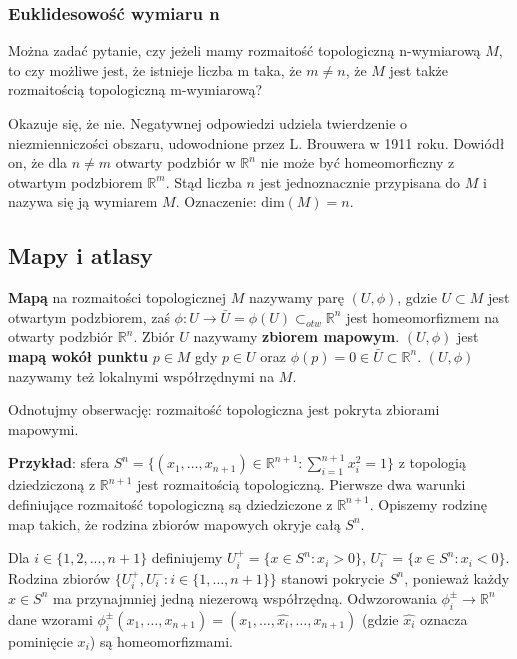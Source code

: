 \subsubsection{Euklidesowość wymiaru n}
Można zadać pytanie, czy jeżeli mamy rozmaitość topologiczną n-wymiarową $M$, to czy możliwe jest, że istnieje liczba m taka, że $m \neq n$, że $M$ jest także rozmaitością topologiczną m-wymiarową?

Okazuje się, że nie. Negatywnej odpowiedzi udziela twierdzenie o niezmienniczości obszaru, udowodnione przez L. Brouwera w 1911 roku. Dowiódł on, że dla $n \neq m$ otwarty podzbiór w $\mathbb{R}^n$ nie może być homeomorficzny z otwartym podzbiorem $\mathbb{R}^m$. Stąd liczba $n$ jest jednoznacznie przypisana do $M$ i nazywa się ją wymiarem $M$. Oznaczenie: $\mathrm{dim}(M) = n$.

\subsection{Mapy i atlasy}
\begin{definition}
	\textbf{Mapą} na rozmaitości topologicznej $M$ nazywamy parę $(U,\phi)$, gdzie $U \subset M$ jest otwartym podzbiorem, zaś $\phi : U \to \bar{U} = \phi(U) \subset_{otw} \mathbb{R}^n$ jest homeomorfizmem na otwarty podzbiór $\mathbb{R}^n$. Zbiór $U$ nazywamy \textbf{zbiorem mapowym}. $(U, \phi)$ jest \textbf{mapą wokół punktu} $p \in M$ gdy $p \in U$ oraz $\phi(p) = 0 \in \bar{U} \subset \mathbb{R}^n$. $(U,\phi)$ nazywamy też lokalnymi współrzędnymi na $M$.
\end{definition}

Odnotujmy obserwację: rozmaitość topologiczna jest pokryta zbiorami mapowymi.

\textbf{Przykład}: sfera $S^n = \{(x_1, \dots, x_{n+1}) \in \mathbb{R}^{n+1} : \sum_{i=1}^{n+1} x_i^2=1\}$ z topologią dziedziczoną z $\mathbb{R}^{n+1}$ jest rozmaitością topologiczną. Pierwsze dwa warunki definiujące rozmaitość topologiczną są dziedziczone z $\mathbb{R}^{n+1}$. Opiszemy rodzinę map takich, że rodzina zbiorów mapowych okryje całą $S^n$.

Dla $i \in \{1, 2, ..., n+1\}$ definiujemy $U_i^+ = \{x \in S^n : x_i > 0\}$, $U_i^- = \{x \in S^n : x_i < 0\}$. Rodzina zbiorów $\{U_i^+, U_i^- : i \in \{1, \dots, n+1\}\}$ stanowi pokrycie $S^n$, ponieważ każdy $x \in S^n$ ma przynajmniej jedną niezerową współrzędną. Odwzorowania $\phi_i^{\pm} \to \mathbb{R}^n$ dane wzorami $\phi_i^{\pm}(x_1, \dots, x_{n+1}) = (x_1, \dots, \hat{x_i}, \dots, x_{n+1})$ (gdzie $\hat{x_i}$ oznacza pominięcie $x_i$) są homeomorfizmami.


